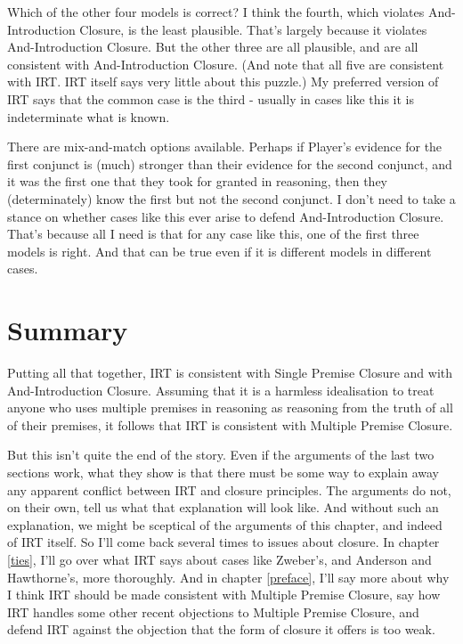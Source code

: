 \documentclass[11pt,]{book}
\begin{document}
Which of the other four models is correct? I think the fourth, which violates And-Introduction Closure, is the least plausible. That's largely because it violates And-Introduction Closure. But the other three are all plausible, and are all consistent with And-Introduction Closure. (And note that all five are consistent with IRT. IRT itself says very little about this puzzle.) My preferred version of IRT says that the common case is the third - usually in cases like this it is indeterminate what is known.

There are mix-and-match options available. Perhaps if Player's evidence for the first conjunct is (much) stronger than their evidence for the second conjunct, and it was the first one that they took for granted in reasoning, then they (determinately) know the first but not the second conjunct. I don't need to take a stance on whether cases like this ever arise to defend And-Introduction Closure. That's because all I need is that for any case like this, one of the first three models is right. And that can be true even if it is different models in different cases.

\hypertarget{closuresummary}{%
\section{Summary}\label{closuresummary}}

Putting all that together, IRT is consistent with Single Premise Closure and with And-Introduction Closure. Assuming that it is a harmless idealisation to treat anyone who uses multiple premises in reasoning as reasoning from the truth of all of their premises, it follows that IRT is consistent with Multiple Premise Closure.

But this isn't quite the end of the story. Even if the arguments of the last two sections work, what they show is that there must be some way to explain away any apparent conflict between IRT and closure principles. The arguments do not, on their own, tell us what that explanation will look like. And without such an explanation, we might be sceptical of the arguments of this chapter, and indeed of IRT itself. So I'll come back several times to issues about closure. In chapter \ref{ties}, I'll go over what IRT says about cases like Zweber's, and Anderson and Hawthorne's, more thoroughly. And in chapter \ref{preface}, I'll say more about why I think IRT should be made consistent with Multiple Premise Closure, say how IRT handles some other recent objections to Multiple Premise Closure, and defend IRT against the objection that the form of closure it offers is too weak.
\end{document}

